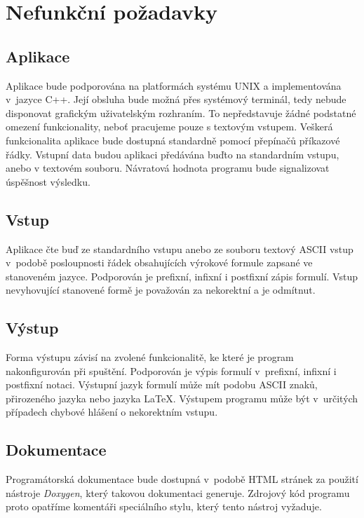 \documentclass[thesis=B,czech,hidelinks]{thesis}[2012/06/26]
\begin{document}
\section{Nefunkční požadavky}

\subsection{Aplikace}

Aplikace bude podporována na platformách systému UNIX a implementována v~jazyce C++. Její obsluha bude možná přes systémový terminál, tedy nebude disponovat grafickým uživatelským rozhraním. To nepředstavuje žádné podstatné omezení funkcionality, neboť pracujeme pouze s textovým vstupem. Veškerá funkcionalita aplikace bude dostupná standardně pomocí přepínačů příkazové řádky. Vstupní data budou aplikaci předávána buďto na standardním vstupu, anebo v textovém souboru. Návratová hodnota programu bude signalizovat úspěšnost výsledku.

\subsection{Vstup}

Aplikace čte buď ze standardního vstupu anebo ze souboru textový ASCII vstup v~podobě posloupnosti řádek obsahujících výrokové formule zapsané ve stanoveném jazyce. Podporován je prefixní, infixní i postfixní zápis formulí. Vstup nevyhovující stanovené formě je považován za nekorektní a je odmítnut.

\subsection{Výstup}

Forma výstupu závisí na zvolené funkcionalitě, ke které je program nakonfigurován při spuštění. Podporován je výpis formulí v~prefixní, infixní i postfixní notaci. Výstupní jazyk formulí může mít podobu ASCII znaků, přirozeného jazyka nebo jazyka \LaTeX . Výstupem programu může být v~určitých případech chybové hlášení o nekorektním vstupu.

\subsection{Dokumentace}

Programátorská dokumentace bude dostupná v~podobě HTML stránek za použití nástroje \emph{Doxygen}, který takovou dokumentaci generuje. Zdrojový kód programu proto opatříme komentáři speciálního stylu, který tento nástroj vyžaduje.
\end{document}
